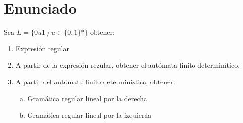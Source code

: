 \documentclass[10pt,a4paper,spanish]{report}
\begin{document}
\section{\textcolor{p2}Enunciado}
Sea $L = \{0u1~/~u\in\{0,1\}*\}$ obtener:
\begin{enumerate}[1.]
  \item Expresión regular
  \item A partir de la expresión regular, obtener el autómata finito determinítico.
  \item A partir del autómata finito determinístico, obtener:
  \begin{enumerate}[a)]
    \item Gramática regular lineal por la derecha
    \item Gramática regular lineal por la izquierda
  \end{enumerate}
\end{enumerate}
\end{document}
